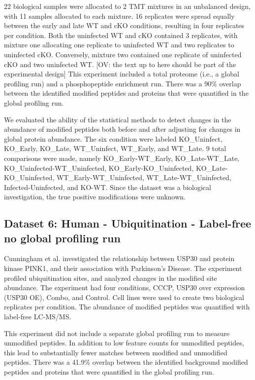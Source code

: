 \documentclass[mcp]{article}
\numberwithin{table}{section}
\def\todo#1{{\color{red}[#1]}}
\begin{document}
\medskip {} 22 biological samples were allocated to 2 TMT mixtures in an unbalanced design, with 11 samples allocated to each mixture. 16 replicates were spread equally between the early and late WT and cKO conditions, resulting in four replicates per condition. Both the uninfected WT and cKO contained 3 replicates, with mixture one allocating one replicate to uninfected WT and two replicates to uninfected cKO. Conversely, mixture two contained one replicate of uninfected cKO and two uninfected WT. \todo{OV: the text up to here should be part of the experimental design}  This experiment included a total proteome (i.e., a global profiling run) and a phosphopeptide enrichment run. There was a 90\% overlap between the identified modified peptides and proteins that were quantified in the global profiling run.

\medskip {} We evaluated the ability of the statistical methods to detect changes in the abundance of modified peptides both before and after adjusting for changes in global protein abundance. The six condition were labeled KO\_Uninfect, KO\_Early, KO\_Late, WT\_Uninfect, WT\_Early, and WT\_Late. 9 total comparisons were made, namely KO\_Early-WT\_Early, KO\_Late-WT\_Late, KO\_Uninfected-WT\_Uninfected, KO\_Early-KO\_Uninfected, KO\_Late-KO\_Uninfected, WT\_Early-WT\_Uninfected, WT\_Late-WT\_Uninfected, Infected-Uninfected, and KO-WT. Since the dataset was a biological investigation, the true positive modifications were unknown.


\subsection*{Dataset 6: Human - Ubiquitination - Label-free no global profiling run}
\label{sec:exp_proc_dataset6}

\medskip {} Cunningham et al. \cite{Cunningham2015} investigated the relationship between USP30 and protein kinase PINK1, and their association with Parkinson’s Disease. The experiment profiled ubiquitination sites, and analyzed changes in the modified site abundance. The experiment had four conditions, CCCP, USP30 over expression (USP30 OE), Combo, and Control. Cell lines were used to create two biological replicates per condition. The abundance of modified peptides was quantified with label-free LC-MS/MS.

\medskip {} This experiment did not include a separate global profiling run to measure unmodified peptides. In addition to low feature counts for unmodified peptides,  this lead to substantially fewer matches between modified and unmodified peptides. There was a 41.9\% overlap between the identified background modified peptides and proteins that were quantified in the global profiling run.
\end{document}
